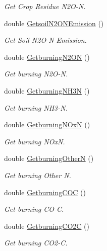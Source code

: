 \begin{DoxyCompactItemize}
\begin{DoxyCompactList}\small\item\em Get Crop Residue N2\+O-\/N. \end{DoxyCompactList}\item 
double \mbox{\hyperlink{class_crop_class_abc1b073bf352a5f60c62f4a2601b4ac3}{Getsoil\+N2\+O\+N\+Emission}} ()
\begin{DoxyCompactList}\small\item\em Get Soil N2\+O-\/N Emission. \end{DoxyCompactList}\item 
double \mbox{\hyperlink{class_crop_class_a7ff60b7ab1e8c511aea2f2dafea64a3b}{Getburning\+N2\+ON}} ()
\begin{DoxyCompactList}\small\item\em Get burning N2\+O-\/N. \end{DoxyCompactList}\item 
double \mbox{\hyperlink{class_crop_class_ad6c4f92731a11322c64054127124ff8c}{Getburning\+N\+H3N}} ()
\begin{DoxyCompactList}\small\item\em Get burning N\+H3-\/N. \end{DoxyCompactList}\item 
double \mbox{\hyperlink{class_crop_class_a051aa055cabad8c5bd5a6ad51decce3a}{Getburning\+N\+OxN}} ()
\begin{DoxyCompactList}\small\item\em Get burning N\+OxN. \end{DoxyCompactList}\item 
double \mbox{\hyperlink{class_crop_class_aed98396d4eef588c681a3d99728fe83f}{Getburning\+OtherN}} ()
\begin{DoxyCompactList}\small\item\em Get burning Other N. \end{DoxyCompactList}\item 
double \mbox{\hyperlink{class_crop_class_a2b2effa3b4257e0f29d2ca7601c0bae2}{Getburning\+C\+OC}} ()
\begin{DoxyCompactList}\small\item\em Get burning C\+O-\/C. \end{DoxyCompactList}\item 
double \mbox{\hyperlink{class_crop_class_a6098219aab64aa4db6f74775d59ca4b9}{Getburning\+C\+O2C}} ()
\begin{DoxyCompactList}\small\item\em Get burning C\+O2-\/C. \end{DoxyCompactList}\item 

\end{DoxyCompactItemize}
